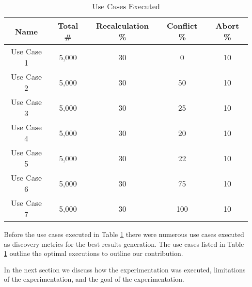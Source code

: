 \begin{table}
\captionsetup{justification=centering}
\centering
 \begin{tabular}{|| c | c | c | c | c ||} 
 \hline
 \textbf{Name} & \textbf{Total \#} & \textbf{Recalculation \%} &  \textbf{Conflict \%} & \textbf{Abort \%} \\ [0.5ex] 
 \hline\hline
 Use Case 1 & 5,000 & 30 & 0 & 10  \\ 
 \hline
 Use Case 2 & 5,000 & 30 & 50 & 10  \\ 
 \hline
 Use Case 3 & 5,000 & 30 & 25 & 10  \\ 
 \hline
 Use Case 4 & 5,000 & 30 & 20 & 10  \\ 
 \hline
 Use Case 5 & 5,000 & 30 & 22 & 10  \\ 
 \hline
 Use Case 6 & 5,000 & 30 & 75 & 10  \\ 
 \hline
 Use Case 7 & 5,000 & 30 & 100 & 10  \\ 
 [1ex] 
 \hline
\end{tabular}
\caption{Use Cases Executed}
\label{tbl:use_cases} %
\end{table}

Before the use cases executed in Table \ref{tbl:use_cases} there were numerous use cases executed as discovery metrics for the best results generation. The use cases listed in Table \ref{tbl:use_cases} outline the optimal executions to outline our contribution.

In the next section we discuss how the experimentation was executed, limitations of the experimentation, and the goal of the experimentation.